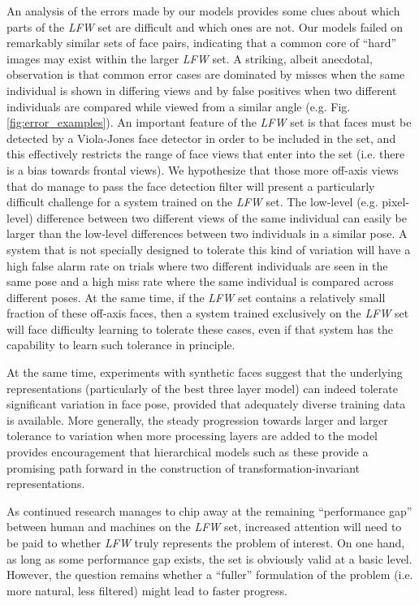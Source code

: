 An analysis of the errors made by our models provides some clues about which
parts of the \emph{LFW} set are difficult and which ones are not.  Our models
failed on remarkably similar sets of face pairs, indicating that a common core
of ``hard'' images may exist within the larger \emph{LFW} set.  A striking,
albeit anecdotal, observation is that common error cases are dominated by misses
when the same individual is shown in differing views and by false positives
when two different individuals are compared while viewed from a similar angle
(e.g. Fig. \ref{fig:error_examples}).  An important feature of the \emph{LFW}
set is that faces must be detected by a Viola-Jones face detector in order to be
included in the set, and this effectively restricts the range of face views that
enter into the set (i.e. there is a bias towards frontal views).  We hypothesize
that those more off-axis views that do manage to pass the face detection filter
will present a particularly difficult challenge for a system trained on
the \emph{LFW} set.  The low-level (e.g. pixel-level) difference between two
different views of the same individual can easily be larger than the low-level
differences between two individuals in a similar pose.  A system that is not
specially designed to tolerate this kind of variation will have a high false
alarm rate on trials where two different individuals are seen in the same pose
and a high miss rate where the same individual is compared across different
poses.  At the same time, if the \emph{LFW} set contains a relatively small
fraction of these off-axis faces, then a system trained exclusively on
the \emph{LFW} set will face difficulty learning to tolerate these cases, even
if that system has the capability to learn such tolerance in principle.

At the same time, experiments with synthetic faces suggest that the underlying 
representations (particularly of the best three layer model) can indeed tolerate
significant variation in face pose, provided that adequately diverse training data
is available.  More generally, the steady progression towards larger 
and larger tolerance to variation when more processing layers are added to the 
model provides encouragement that hierarchical models such as these provide 
a promising path forward in the construction of transformation-invariant 
representations.

As continued research manages to chip away at the remaining ``performance gap''
between human and machines on the \emph{LFW} set, increased attention will need
to be paid to whether \emph{LFW} truly represents the problem of interest.  On
one hand, as long as some performance gap exists, the set is obviously valid at
a basic level.  However, the question remains whether a ``fuller'' formulation
of the problem (i.e. more natural, less filtered) might lead to faster progress.

